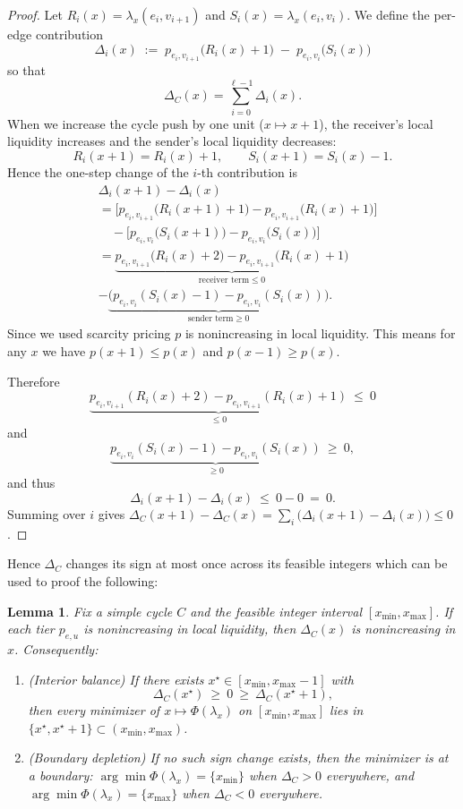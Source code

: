 \documentclass[10pt,twocolumn]{article}
\newtheorem{lemma}[theorem]{Lemma}
\begin{document}
\begin{proof}
Let $R_i(x)=\lambda_x(e_i,v_{i+1})$ and $S_i(x)=\lambda_x(e_i,v_i)$.
We define the per-edge contribution
\[
\Delta_i(x)\;:=\;p_{e_i,v_{i+1}}\big(R_i(x)+1\big)\;-\;p_{e_i,v_i}\big(S_i(x)\big)\]
so that
\[
\Delta_C(x)=\sum_{i=0}^{\ell-1} \Delta_i(x).
\]
When we increase the cycle push by one unit ($x\mapsto x+1$), the receiver’s local liquidity increases and the sender’s local liquidity decreases:
\[
R_i(x+1)=R_i(x)+1,\qquad S_i(x+1)=S_i(x)-1.
\]
Hence the one-step change of the $i$-th contribution is
\begin{align*}
& \Delta_i(x+1)-\Delta_i(x) \\
&=\Big[p_{e_i,v_{i+1}}\big(R_i(x+1)+1\big)-p_{e_i,v_{i+1}}\big(R_i(x)+1\big)\Big]\\
&\quad-\Big[p_{e_i,v_i}\big(S_i(x+1)\big)-p_{e_i,v_i}\big(S_i(x)\big)\Big]\\
  &=\underbrace{p_{e_i,v_{i+1}}\big(R_i(x)+2\big)-p_{e_i,v_{i+1}}\big(R_i(x)+1\big)}_{\text{receiver term} \leq 0}\\
& -
\underbrace{\big(p_{e_i,v_i}(S_i(x)-1)-p_{e_i,v_i}(S_i(x))\big)}_{\text{sender term}\geq 0}.
\end{align*}
Since we used scarcity pricing $p$ is nonincreasing in local liquidity. This means for any $x$ we have $p(x+1)\le p(x)$ and $p(x-1)\ge p(x)$.

Therefore
\[
\underbrace{p_{e_i,v_{i+1}}(R_i(x)+2)-p_{e_i,v_{i+1}}(R_i(x)+1)}_{\le 0}\ \le\ 0
\]
and
\[
\underbrace{p_{e_i,v_i}(S_i(x)-1)-p_{e_i,v_i}(S_i(x))}_{\ge 0}\ \ge\ 0,
\]
and thus
\[
\Delta_i(x+1)-\Delta_i(x)\ \le\ 0-0\ =\ 0.
\]
Summing over $i$ gives $\Delta_C(x+1)-\Delta_C(x)=\sum_i\big(\Delta_i(x+1)-\Delta_i(x)\big)\le 0$.
\end{proof}

Hence $\Delta_C$ changes its sign at most once across its feasible integers which can be used to proof the following:

\begin{lemma}
\label{lem:cycle-optimality}
Fix a simple cycle $C$ and the feasible integer interval $[x_{\min},x_{\max}]$.
If each tier $p_{e,u}$ is nonincreasing in local liquidity, then $\Delta_C(x)$ is nonincreasing in $x$.
Consequently:
\begin{enumerate}
\item (\emph{Interior balance}) If there exists $x^\star\in[x_{\min},x_{\max}-1]$ with
\[
\Delta_C(x^\star)\ \ge\ 0\ \ge\ \Delta_C(x^\star\!+\!1),
\]
then every minimizer of $x\mapsto \Phi(\lambda_x)$ on $[x_{\min},x_{\max}]$ lies in $\{x^\star,x^\star\!+\!1\}\subset (x_{\min},x_{\max})$.
\item (\emph{Boundary depletion}) If no such sign change exists, then the minimizer is at a boundary:
$\arg\min \Phi(\lambda_x)=\{x_{\min}\}$ when $\Delta_C>0$ everywhere, and
$\arg\min \Phi(\lambda_x)=\{x_{\max}\}$ when $\Delta_C<0$ everywhere.
\end{enumerate}
\end{lemma}
\end{document}
